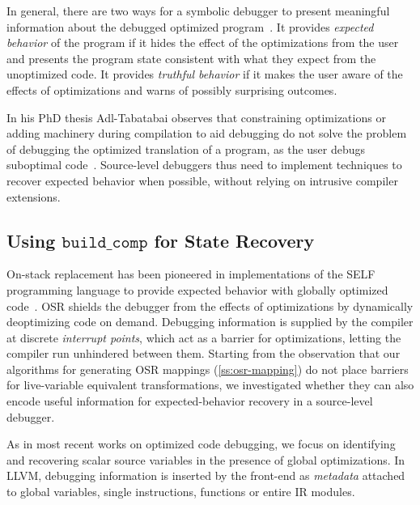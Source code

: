 In general, there are two ways for a symbolic debugger to present meaningful information about the debugged optimized program~\cite{Wu99}. It provides {\em expected behavior} of the program if it hides the effect of the optimizations from the user and presents the program state consistent with what they expect from the unoptimized code. It provides {\em truthful behavior} if it makes the user aware of the effects of optimizations and warns of possibly surprising outcomes.

In his PhD thesis Adl-Tabatabai observes that constraining optimizations or adding machinery during compilation to aid debugging do not solve the problem of debugging the optimized translation of a program, as the user debugs suboptimal code~\cite{Adl-Tabatabai96thesis}. Source-level debuggers thus need to implement techniques to recover expected behavior when possible, without relying on intrusive compiler extensions.

\subsection{Using \texorpdfstring{$\texttt{build\_comp}$}{build\_comp} for State Recovery}
On-stack replacement has been pioneered in implementations of the SELF programming language to provide expected behavior with globally optimized code~\cite{Holzle92}. OSR shields the debugger from the effects of optimizations by dynamically deoptimizing code on demand. Debugging information is supplied by the compiler at discrete {\em interrupt points}, which act as a barrier for optimizations, letting the compiler run unhindered between them. Starting from the observation that our algorithms for generating OSR mappings (\mysection\ref{ss:osr-mapping}) do not place barriers for live-variable equivalent transformations, we investigated whether they can also encode useful information for expected-behavior recovery in a source-level debugger.

As in most recent works on optimized code debugging, we focus on identifying and recovering scalar source variables in the presence of global optimizations. In LLVM, debugging information is inserted by the front-end as {\em metadata} attached to global variables, single instructions, functions or entire IR modules.


